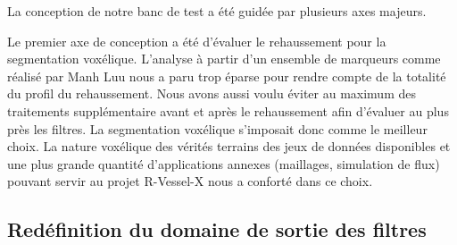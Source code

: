   \begin{table}
    \begin{center}
    \end{center}
    \caption{Origine des méthodes. La diversité des provenances et l'ancienneté du code complique la mise en oeuvre d'une comparaison des filtres.}
    \label{Tab:origins_vesselness}
  \end{table}

La conception de notre banc de test a été guidée par plusieurs axes majeurs.
  
Le premier axe de conception a été d'évaluer le rehaussement pour la segmentation voxélique. L'analyse à partir d'un ensemble de marqueurs comme réalisé par Manh Luu nous a paru trop éparse pour rendre compte de la totalité du profil du rehaussement. Nous avons aussi voulu éviter au maximum des traitements supplémentaire avant et après le rehaussement afin d'évaluer au plus près les filtres. La segmentation voxélique s'imposait donc comme le meilleur choix. La nature voxélique des vérités terrains des jeux de données disponibles et une plus grande quantité d'applications annexes (maillages, simulation de flux) pouvant servir au projet R-Vessel-X  nous a conforté dans ce choix.

\subsection{Redéfinition du domaine de sortie des filtres}

